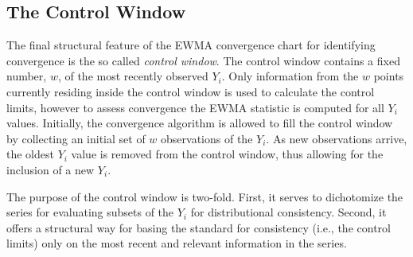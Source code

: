 \documentclass{article}
\begin{document}
%
%
\subsection{The Control Window}
%
%

The final structural feature of the EWMA convergence chart for identifying 
convergence is the so called {\it control window}. The control window contains 
a fixed number, $w$, of the most recently observed $Y_i$. Only information from 
the $w$ points currently residing inside the control window is used to 
calculate the control limits, however to assess convergence the EWMA statistic 
is computed for all $Y_i$ values. Initially, the convergence algorithm is 
allowed to fill the control window by collecting an initial set of $w$ 
observations of the $Y_i$. As new observations arrive, the oldest $Y_i$ value 
is removed from the control window, thus allowing for the inclusion of a new 
$Y_i$.

%
%

The purpose of the control window is two-fold. First, it serves to dichotomize 
the series for evaluating subsets of the $Y_i$ for distributional 
consistency. Second, it offers a structural way for basing the standard for 
consistency (i.e., the control limits) only on the most recent and relevant 
information in the series. 

%
%

                                                                                                         



%
%
%
\end{document}
